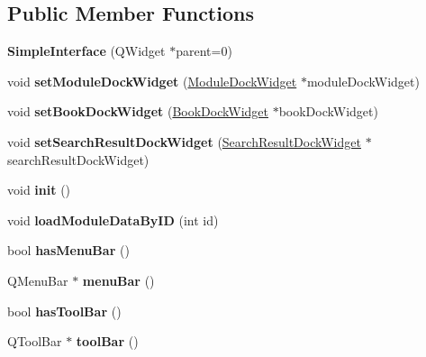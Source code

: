 \subsection*{Public Member Functions}
\begin{DoxyCompactItemize}
\item 
\hypertarget{classSimpleInterface_ae9b8931df8a1d4221961475c71045d11}{
{\bfseries SimpleInterface} (QWidget $\ast$parent=0)}
\label{classSimpleInterface_ae9b8931df8a1d4221961475c71045d11}

\item 
\hypertarget{classSimpleInterface_a19ef14ae0d1abad9f47f1d859eb200b8}{
void {\bfseries setModuleDockWidget} (\hyperlink{classModuleDockWidget}{ModuleDockWidget} $\ast$moduleDockWidget)}
\label{classSimpleInterface_a19ef14ae0d1abad9f47f1d859eb200b8}

\item 
\hypertarget{classSimpleInterface_a69591d9e7f7cb5852db56a85fdae3cbe}{
void {\bfseries setBookDockWidget} (\hyperlink{classBookDockWidget}{BookDockWidget} $\ast$bookDockWidget)}
\label{classSimpleInterface_a69591d9e7f7cb5852db56a85fdae3cbe}

\item 
\hypertarget{classSimpleInterface_afd0c9b660945c479749885da6d3c995d}{
void {\bfseries setSearchResultDockWidget} (\hyperlink{classSearchResultDockWidget}{SearchResultDockWidget} $\ast$searchResultDockWidget)}
\label{classSimpleInterface_afd0c9b660945c479749885da6d3c995d}

\item 
\hypertarget{classSimpleInterface_a3b8192436322c67e221ef92546857d44}{
void {\bfseries init} ()}
\label{classSimpleInterface_a3b8192436322c67e221ef92546857d44}

\item 
\hypertarget{classSimpleInterface_ae8be3faadd1d9dba0d2aeb76b4379df5}{
void {\bfseries loadModuleDataByID} (int id)}
\label{classSimpleInterface_ae8be3faadd1d9dba0d2aeb76b4379df5}

\item 
\hypertarget{classSimpleInterface_a7109b7689d9f3c1b09d09cbadb189943}{
bool {\bfseries hasMenuBar} ()}
\label{classSimpleInterface_a7109b7689d9f3c1b09d09cbadb189943}

\item 
\hypertarget{classSimpleInterface_a89a45943356c19a5a1fdbbcfb01a0222}{
QMenuBar $\ast$ {\bfseries menuBar} ()}
\label{classSimpleInterface_a89a45943356c19a5a1fdbbcfb01a0222}

\item 
\hypertarget{classSimpleInterface_aeddfd02a102a4377d748a107aee2dfc5}{
bool {\bfseries hasToolBar} ()}
\label{classSimpleInterface_aeddfd02a102a4377d748a107aee2dfc5}

\item 
\hypertarget{classSimpleInterface_a871eb6123a314405280b01f689167046}{
QToolBar $\ast$ {\bfseries toolBar} ()}
\label{classSimpleInterface_a871eb6123a314405280b01f689167046}

\end{DoxyCompactItemize}
